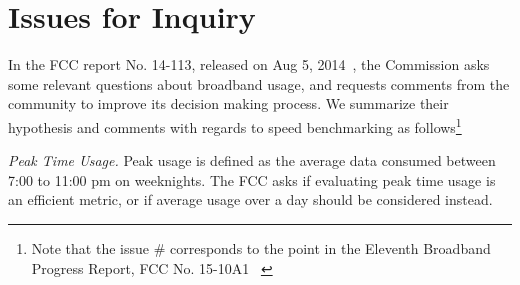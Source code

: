 \section{Issues for Inquiry}
\label{sec:issues}

In the FCC report No. 14-113, released on Aug 5, 2014~\cite{fcc2014progress-report}, the Commission asks some relevant questions about broadband usage, and requests comments from the community to improve its decision making process. We summarize their hypothesis and comments with regards to speed benchmarking as follows\footnote{Note that the issue \# corresponds to the point in the Eleventh Broadband Progress Report,
FCC No. 15-10A1 ~\cite{fcc2015progress-report}\label{foot:fcc-issue-numbers}}

 \emph{Peak Time Usage.} Peak usage is defined as the average data consumed between 7:00 to 11:00 pm on weeknights. The FCC asks if evaluating peak time usage is an efficient metric, or if average usage over a day should be considered instead.

